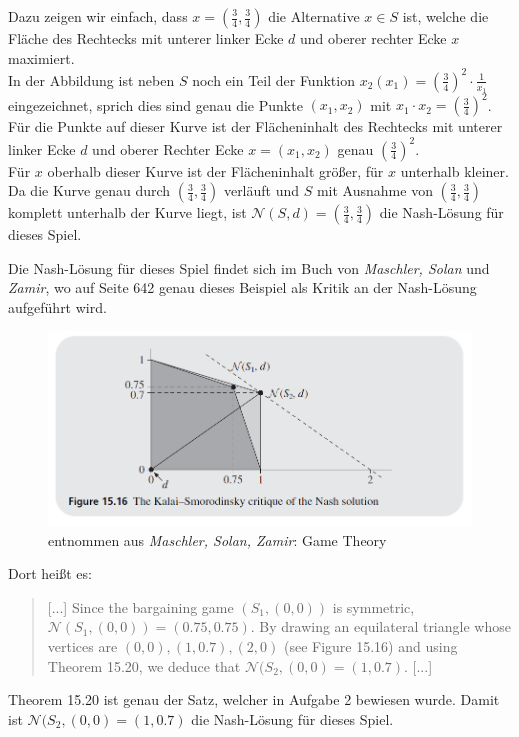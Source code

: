 \documentclass{scrartcl}
\newcommand{\subexercise}[1]{\vspace{0.8em}\noindent{\bf #1)}}
\begin{document}
Dazu zeigen wir einfach, dass $x =(\frac{3}{4}, \frac{3}{4})$ die Alternative $x \in S$ ist, welche die Fläche
des Rechtecks mit unterer linker Ecke $d$ und oberer rechter Ecke $x$ maximiert. \\

In der Abbildung ist neben $S$ noch ein Teil der Funktion $x_2(x_1) = (\frac{3}{4})^2 \cdot \frac{1}{x_1}$
eingezeichnet, sprich dies sind genau die Punkte $(x_1, x_2)$ mit $x_1 \cdot x_2 = (\frac{3}{4})^2$. Für die
Punkte auf dieser Kurve ist der Flächeninhalt des Rechtecks mit unterer linker Ecke $d$ und oberer Rechter
Ecke $x = (x_1, x_2)$ genau $(\frac{3}{4})^2$. \\

Für $x$ oberhalb dieser Kurve ist der Flächeninhalt größer, für $x$ unterhalb kleiner. Da die Kurve genau durch
$(\frac{3}{4}, \frac{3}{4})$ verläuft und $S$ mit Ausnahme von $(\frac{3}{4}, \frac{3}{4})$ komplett unterhalb der
Kurve liegt, ist $\mathcal{N}(S, d) = (\frac{3}{4}, \frac{3}{4})$ die Nash-Lösung für dieses Spiel. \clearpage

\subexercise{b}
Die Nash-Lösung für dieses Spiel findet sich im Buch von \textsl{Maschler, Solan} und \textsl{Zamir}, wo auf
Seite 642 genau dieses Beispiel als Kritik an der Nash-Lösung aufgeführt wird. \\

\begin{figure}[h!]
\includegraphics[width=1\textwidth]{images/3b.png}
\caption{entnommen aus \textsl{Maschler, Solan, Zamir}: Game Theory}
\end{figure}

Dort heißt es:
\begin{quotation}
[...] Since the bargaining game $(S_1,(0,0))$ is symmetric, $\mathcal{N}(S_1,(0,0)) = (0.75, 0.75)$. By
drawing an equilateral triangle whose vertices are $(0,0), (1,0.7), (2,0)$ (see Figure 15.16) and
using Theorem 15.20, we deduce that $\mathcal{N}(S_2,(0,0) = (1,0.7)$. [...]
\end{quotation}

Theorem 15.20 ist genau der Satz, welcher in Aufgabe 2 bewiesen wurde. Damit ist $\mathcal{N}(S_2,
(0,0) = (1,0.7)$ die Nash-Lösung für dieses Spiel.
\end{document}
